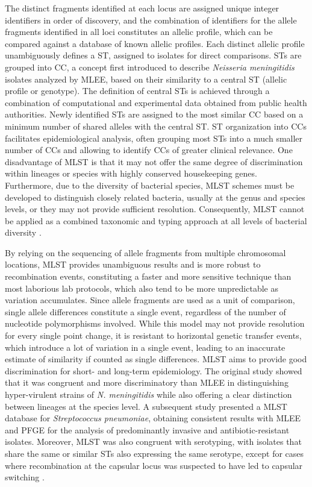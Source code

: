 The distinct fragments identified at each locus are assigned unique integer identifiers in order of discovery, and the combination of identifiers for the allele fragments identified in all loci constitutes an allelic profile, which can be compared against a database of known allelic profiles. Each distinct allelic profile unambiguously defines a \ac{ST}, assigned to isolates for direct comparisons. \ac{ST}s are grouped into \ac{CC}, a concept first introduced to describe \textit{Neisseria meningitidis} isolates analyzed by \ac{MLEE}, based on their similarity to a central \ac{ST} (allelic profile or genotype). The definition of central \ac{ST}s is achieved through a combination of computational and experimental data obtained from public health authorities. Newly identified \ac{ST}s are assigned to the most similar \ac{CC} based on a minimum number of shared alleles with the central \ac{ST}. \ac{ST} organization into \ac{CC}s facilitates epidemiological analysis, often grouping most \ac{ST}s into a much smaller number of \ac{CC}s and allowing to identify \ac{CC}s of greater clinical relevance. One disadvantage of \ac{MLST} is that it may not offer the same degree of discrimination within lineages or species with highly conserved housekeeping genes. Furthermore, due to the diversity of bacterial species, \ac{MLST} schemes must be developed to distinguish closely related bacteria, usually at the genus and species levels, or they may not provide sufficient resolution. Consequently, \ac{MLST} cannot be applied as a combined taxonomic and typing approach at all levels of bacterial diversity \cite{jolley_ribosomal_2012}.

By relying on the sequencing of allele fragments from multiple chromosomal locations, \ac{MLST} provides unambiguous results and is more robust to recombination events, constituting a faster and more sensitive technique than most laborious lab protocols, which also tend to be more unpredictable as variation accumulates. Since allele fragments are used as a unit of comparison, single allele differences constitute a single event, regardless of the number of nucleotide polymorphisms involved. While this model may not provide resolution for every single point change, it is resistant to horizontal genetic transfer events, which introduce a lot of variation in a single event, leading to an inaccurate estimate of similarity if counted as single differences. \ac{MLST} aims to provide good discrimination for short- and long-term epidemiology. The original study showed that it was congruent and more discriminatory than \ac{MLEE} in distinguishing hyper-virulent strains of \textit{N. meningitidis} while also offering a clear distinction between lineages at the species level. A subsequent study presented a \ac{MLST} database for \textit{Streptococcus pneumoniae}, obtaining consistent results with \ac{MLEE} and \ac{PFGE} for the analysis of predominantly invasive and antibiotic-resistant isolates. Moreover, \ac{MLST} was also congruent with serotyping, with isolates that share the same or similar \ac{ST}s also expressing the same serotype, except for cases where recombination at the capsular locus was suspected to have led to capsular switching \cite{enright_multilocus_1999}.

